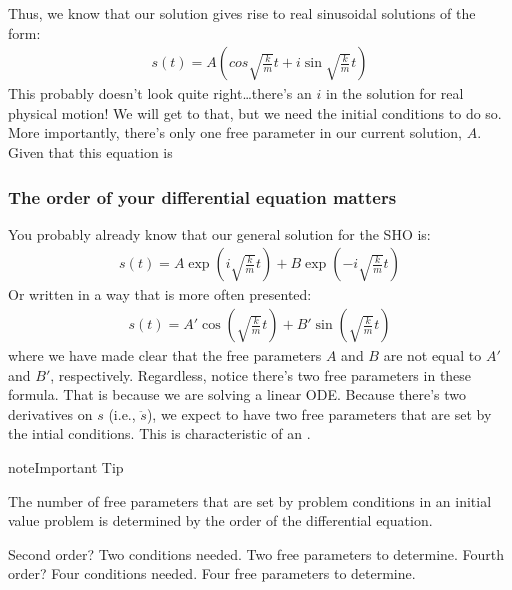 \documentclass[letterpaper,10pt,english]{jupyterBook}
\begin{document}
\sphinxAtStartPar
Thus, we know that our solution gives rise to real sinusoidal solutions of the form:
\begin{equation*}
\begin{split}s(t) = A\left(cos{\sqrt{\frac{k}{m}} t} + i\sin{\sqrt{\frac{k}{m}} t}\right)\end{split}
\end{equation*}
\sphinxAtStartPar
This probably doesn’t look quite right…there’s an \(i\) in the solution for real physical motion! We will get to that, but we need the initial conditions to do so. More importantly, there’s only one free parameter in our current solution, \(A\). Given that this equation is 


\subsubsection{The order of your differential equation matters}
\label{\detokenize{content/1_modeling/SHO-intro:the-order-of-your-differential-equation-matters}}
\sphinxAtStartPar
You probably already know that our general solution for the SHO is:
\begin{equation*}
\begin{split}s(t) = A\exp(i\sqrt{\frac{k}{m}} t) + B\exp(-i\sqrt{\frac{k}{m}} t)\end{split}
\end{equation*}
\sphinxAtStartPar
Or written in a way that is more often presented:
\begin{equation*}
\begin{split}s(t) = A'\cos(\sqrt{\frac{k}{m}} t) + B'\sin(\sqrt{\frac{k}{m}} t)\end{split}
\end{equation*}
\sphinxAtStartPar
where we have made clear that the free parameters \(A\) and \(B\) are not equal to \(A'\) and \(B'\), respectively. Regardless, notice there’s two free parameters in these formula. That is because we are solving a  linear ODE. Because there’s two derivatives on \(s\) (i.e., \(\ddot{s}\)), we expect to have two free parameters that are set by the intial conditions. This is characteristic of an .

\begin{sphinxadmonition}{note}{Important Tip}

\sphinxAtStartPar
The number of free parameters that are set by problem conditions in an initial value problem is determined by the order of the differential equation.

\sphinxAtStartPar
Second order? Two conditions needed. Two free parameters to determine. Fourth order? Four conditions needed. Four free parameters to determine.
\end{sphinxadmonition}
\end{document}
